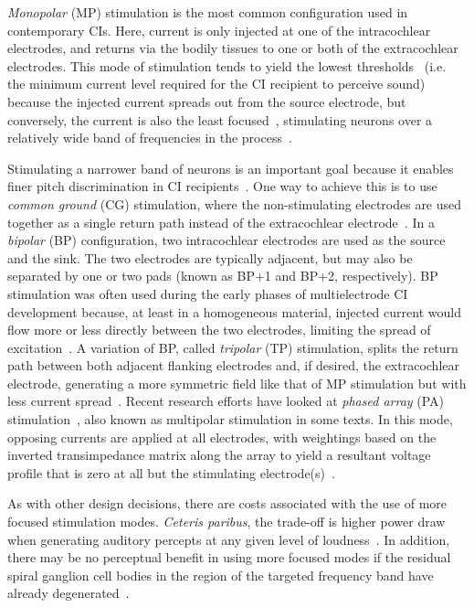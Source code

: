 \emph{Monopolar} (MP) stimulation is the most common configuration used in
contemporary CIs. Here, current is only injected at one of the intracochlear
electrodes, and returns via the bodily tissues to one or both of the
extracochlear electrodes. This mode of stimulation tends to yield the lowest
thresholds~\cite{busby1994} (i.e. the minimum current level required for the CI
recipient to perceive sound) because the injected current spreads out from the
source electrode, but conversely, the current is also the least
focused~\cite{bonham2008}, stimulating neurons over a relatively wide band of
frequencies in the process~\cite{kral1998,vandenhonert2007}.

Stimulating a narrower band of neurons is an important goal because it enables
finer pitch discrimination in CI recipients~\cite{kral1998,vandenhonert2007}.
One way to achieve this is to use \emph{common ground} (CG) stimulation, where
the non-stimulating electrodes are used together as a single return path instead
of the extracochlear electrode~\cite{busby1994}. In a \emph{bipolar} (BP)
configuration, two intracochlear electrodes are used as the source and the sink.
The two electrodes are typically adjacent, but may also be separated by one or
two pads (known as BP+1 and BP+2, respectively). BP stimulation was often used
during the early phases of multielectrode CI development because, at least in a
homogeneous material, injected current would flow more or less directly between
the two electrodes, limiting the spread of excitation~\cite{black1980,kral1998}.
A variation of BP, called \emph{tripolar} (TP) stimulation, splits the return
path between both adjacent flanking electrodes and, if desired, the
extracochlear electrode, generating a more symmetric field like that of MP
stimulation but with less current spread~\cite{kral1998,busby1994}.
Recent research efforts have looked at \emph{phased array} (PA)
stimulation~\cite{vandenhonert2007,frijns2011,george2014}, also known as
multipolar stimulation in some texts. In this mode, opposing currents are
applied at all electrodes, with weightings based on the inverted transimpedance
matrix along the array to yield a resultant voltage profile that is zero at all
but the stimulating electrode(s)~\cite{vandenhonert2007}.

As with other design decisions, there are costs associated with the use of more
focused stimulation modes. \textit{Ceteris paribus}, the trade-off is higher
power draw when generating auditory percepts at any given level of
loudness~\cite{vandenhonert2007,saba2012}. In addition, there may be no
perceptual benefit in using more focused modes if the residual spiral ganglion
cell bodies in the region of the targeted frequency band have already
degenerated~\cite{pfingst2011}.

